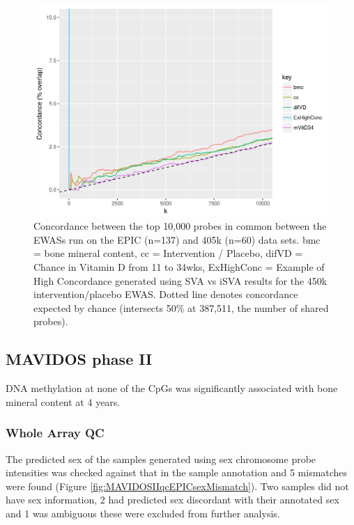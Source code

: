 \documentclass[
]{book}
\begin{document}
\begin{figure}

{\centering \includegraphics[width=0.8\linewidth]{figs/EPIC450kEWASconcordMAVIDOSMonApr162018zoom} 

}

\caption{Concordance between the top 10,000 probes in common between the EWASs run on the EPIC (n=137) and 405k (n=60) data sets. bmc = bone mineral content, cc = Intervention / Placebo, difVD = Chance in Vitamin D from 11 to 34wks, ExHighConc = Example of High Concordance generated using SVA vs iSVA results for the 450k intervention/placebo EWAS. Dotted line denotes concordance expected by chance (intersects 50\% at 387,511, the number of shared probes).}\label{fig:EPIC450kEWASconcordMAVIDOSMonApr162018zoom}
\end{figure}



\hypertarget{mavidos-phase-ii}{%
\subsection{MAVIDOS phase II}\label{mavidos-phase-ii}}

DNA methylation at none of the CpGs was significantly associated with bone mineral content at 4 years.

\hypertarget{whole-array-qc-1}{%
\subsubsection{Whole Array QC}\label{whole-array-qc-1}}

The predicted sex of the samples generated using sex chromosome probe intensities was checked against that in the sample annotation and 5 mismatches were found (Figure \ref{fig:MAVIDOSIIqcEPICsexMismatch}).
Two samples did not have sex information, 2 had predicted sex discordant with their annotated sex and 1 was ambiguous these were excluded from further analysis.
\end{document}
